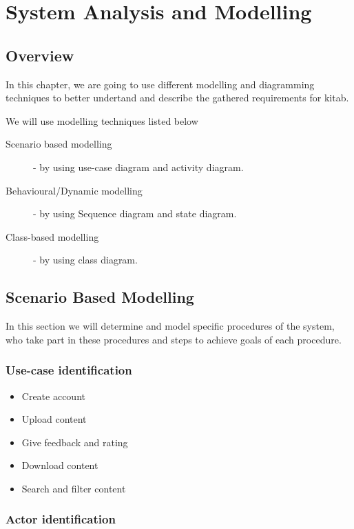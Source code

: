 \chapter{System Analysis and Modelling}
\section{Overview}

In this chapter, we are going to use different modelling and diagramming techniques to better undertand and describe the gathered requirements for kitab.

We will use modelling techniques listed below

	\begin{description}
		\item[Scenario based modelling] - by using use-case diagram and activity diagram.
		\item[Behavioural/Dynamic modelling] - by using Sequence diagram and state diagram.
		\item[Class-based modelling] - by using class diagram.
	\end{description}

\section{Scenario Based Modelling}

In this section we will determine and model specific procedures of the system, who take part in these procedures and steps to achieve goals of each procedure.

	\subsection{Use-case identification}

	\begin{itemize}
		\item Create account
		\item Upload content
		\item Give feedback and rating
		\item Download content
		\item Search and filter content
	\end{itemize}

	\subsection{Actor identification}

